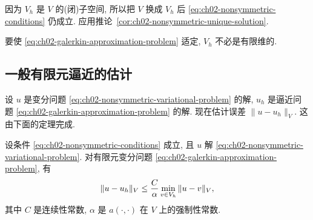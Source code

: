 \begin{Proof}
因为 $V_h$ 是 $V$ 的(闭)子空间, 所以把 $V$ 换成 $V_h$ 后 \eqref{eq:ch02-nonsymmetric-conditions} 仍成立. 应用推论~\ref{cor:ch02-nonsymmetric-unique-solution}.
\end{Proof}

\begin{Remark}
\label{rem:ch02-vh-not-finite-dimensional}
要使 \eqref{eq:ch02-galerkin-approximation-problem} 适定, $V_h$ 不必是有限维的.
\end{Remark}

\subsection{一般有限元逼近的估计}
\label{sec:ch02-general-finite-element-estimates}
\setcounter{thmcount}{0}
\setcounter{equation}{0}

设 $u$ 是变分问题 \eqref{eq:ch02-nonsymmetric-variational-problem} 的解, $u_h$ 是逼近问题 \eqref{eq:ch02-galerkin-approximation-problem} 的解. 现在估计误差 $\|u-u_h\|_V$. 这由下面的定理完成.

\begin{Theorem}[Céa]
\label{thm:ch02-cea}
设条件 \eqref{eq:ch02-nonsymmetric-conditions} 成立, 且 $u$ 解 \eqref{eq:ch02-nonsymmetric-variational-problem}. 对有限元变分问题 \eqref{eq:ch02-galerkin-approximation-problem}, 有
\setcounter{equation}{1}
\begin{equation}
\MathBookFormulaID{formula-ch02-cea-estimate}
\|u-u_h\|_V\leq\frac{C}{\alpha}
\min_{v\in V_h}\|u-v\|_V,
\label{eq:ch02-cea-estimate}
\end{equation}
其中 $C$ 是连续性常数, $\alpha$ 是 $a(\cdot,\cdot)$ 在 $V$ 上的强制性常数.
\end{Theorem}

